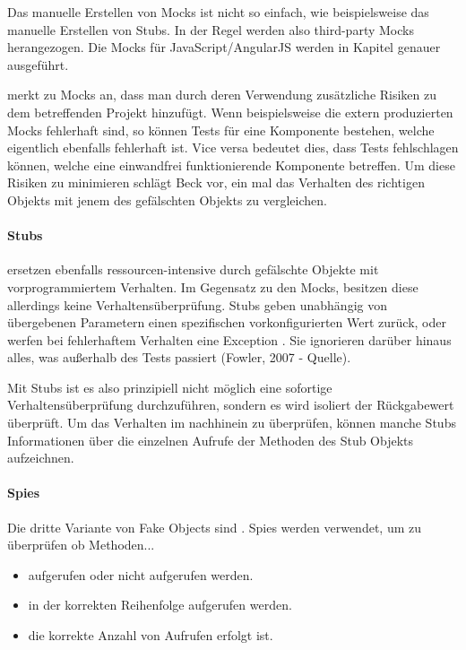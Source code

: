 Das manuelle Erstellen von Mocks ist nicht so einfach, wie beispielsweise das manuelle Erstellen von Stubs. In der Regel werden also third-party Mocks herangezogen. Die Mocks für JavaScript/AngularJS werden in Kapitel  genauer ausgeführt.

\cite[145]{Beck:2003} merkt zu Mocks an, dass man durch deren Verwendung zusätzliche Risiken zu dem betreffenden Projekt hinzufügt. Wenn beispielsweise die extern produzierten Mocks fehlerhaft sind, so können Tests für eine Komponente bestehen, welche eigentlich ebenfalls fehlerhaft ist. Vice versa bedeutet dies, dass Tests fehlschlagen können, welche eine einwandfrei funktionierende Komponente betreffen.
Um diese Risiken zu minimieren schlägt Beck vor, ein mal das Verhalten des richtigen Objekts mit jenem des gefälschten Objekts zu vergleichen.

\paragraph{Stubs}
 ersetzen ebenfalls ressourcen-intensive durch gefälschte Objekte mit vorprogrammiertem Verhalten. Im Gegensatz zu den Mocks, besitzen diese allerdings keine Verhaltensüberprüfung. Stubs geben unabhängig von übergebenen Parametern einen spezifischen vorkonfigurierten Wert zurück, oder werfen bei fehlerhaftem Verhalten eine Exception \autocite[443]{Johansen:2011}. Sie ignorieren darüber hinaus alles, was außerhalb des Tests passiert (Fowler, 2007 - Quelle).

Mit Stubs ist es also prinzipiell nicht möglich eine sofortige Verhaltensüberprüfung durchzuführen, sondern es wird isoliert der Rückgabewert überprüft. Um das Verhalten im nachhinein zu überprüfen, können manche Stubs Informationen über die einzelnen Aufrufe der Methoden des Stub Objekts aufzeichnen.

\paragraph{Spies}
Die dritte Variante von Fake Objects sind . Spies werden verwendet, um zu überprüfen ob Methoden...
\begin{itemize}
  \item aufgerufen oder nicht aufgerufen werden.
  \item in der korrekten Reihenfolge aufgerufen werden.
  \item die korrekte Anzahl von Aufrufen erfolgt ist.
\end{itemize}


